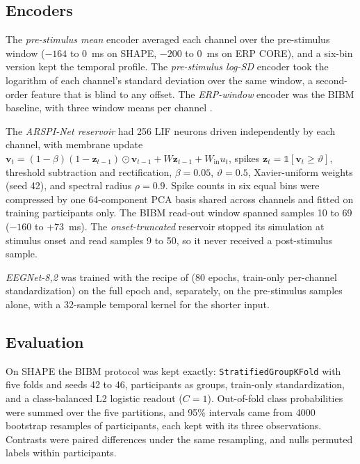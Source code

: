 \subsection{Encoders}
The \emph{pre-stimulus mean} encoder averaged each channel over the pre-stimulus window ($-164$ to $0$~ms on SHAPE, $-200$ to $0$~ms on ERP CORE), and a six-bin version kept the temporal profile. The \emph{pre-stimulus log-SD} encoder took the logarithm of each channel's standard deviation over the same window, a second-order feature that is blind to any offset. The \emph{ERP-window} encoder was the BIBM baseline, with three window means per channel \cite{lane2026bibm}.

The \emph{ARSPI-Net reservoir} \cite{lane2026bibm} had 256 LIF neurons driven independently by each channel, with membrane update $\mathbf{v}_t=(1-\beta)(1-\mathbf{z}_{t-1})\odot\mathbf{v}_{t-1}+W\mathbf{z}_{t-1}+W_\mathrm{in}u_t$, spikes $\mathbf{z}_t=\mathbb{1}[\mathbf{v}_t\ge\vartheta]$, threshold subtraction and rectification, $\beta=0.05$, $\vartheta=0.5$, Xavier-uniform weights (seed 42), and spectral radius $\rho=0.9$. Spike counts in six equal bins were compressed by one 64-component PCA basis shared across channels and fitted on training participants only. The BIBM read-out window spanned samples 10 to 69 ($-160$ to $+73$~ms). The \emph{onset-truncated} reservoir stopped its simulation at stimulus onset and read samples 9 to 50, so it never received a post-stimulus sample.

\emph{EEGNet-8,2} \cite{lawhern2018eegnet} was trained with the recipe of \cite{lane2026bibm} (80 epochs, train-only per-channel standardization) on the full epoch and, separately, on the pre-stimulus samples alone, with a 32-sample temporal kernel for the shorter input.

\subsection{Evaluation}
On SHAPE the BIBM protocol was kept exactly: \texttt{StratifiedGroupKFold} with five folds and seeds 42 to 46, participants as groups, train-only standardization, and a class-balanced L2 logistic readout ($C=1$). Out-of-fold class probabilities were summed over the five partitions, and 95\% intervals came from 4000 bootstrap resamples of participants, each kept with its three observations. Contrasts were paired differences under the same resampling, and nulls permuted labels within participants.

